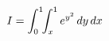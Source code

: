 \documentclass[preview]{standalone}
\begin{document}
\begin{align*}
\special{dvisvgm:raw <g id='unique000'>}\displaystyle I=\int_0^1\!\!\int_x^1 e^{y^2}\,dy\,dx\special{dvisvgm:raw </g>}
\end{align*}
\end{document}
